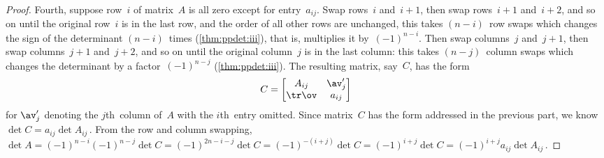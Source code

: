 \begin{proof}
Fourth, suppose row~\(i\) of matrix~\(A\) is all zero except for entry~\(a_{ij}\).
Swap rows~\(i\) and~\(i+1\), then swap rows~\(i+1\) and~\(i+2\), and so on until the original row~\(i\) is in the last row, and the order of all other rows are unchanged, this takes \((n-i)\)~row swaps which changes the sign of the determinant \((n-i)\)~times (\cref{thm:ppdet:iii}), that is, multiplies it by~\((-1)^{n-i}\).
Then swap columns~\(j\) and~\(j+1\), then swap columns~\(j+1\) and~\(j+2\), and so on until the original column~\(j\) is in the last column: this takes \((n-j)\)~column swaps which changes the determinant by a factor~\((-1)^{n-j}\) (\cref{thm:ppdet:iii}).
The resulting matrix, say~\(C\), has the form
\begin{equation*}
C=\begin{bmatrix} A_{ij}&\av'_j\\\tr\ov&a_{ij} \end{bmatrix}
\end{equation*}
for \(\av'_j\) denoting the \(j\)th~column of~\(A\) with the \(i\)th~entry omitted.
Since matrix~\(C\) has the form addressed in the previous part, we know \(\det C=a_{ij}\det A_{ij}\)\,.
From the row and column swapping, \(\det A=(-1)^{n-i}(-1)^{n-j}\det C =(-1)^{2n-i-j}\det C =(-1)^{-(i+j)}\det C =(-1)^{i+j}\det C =(-1)^{i+j}a_{ij}\det A_{ij}\)\,.
\end{proof}




